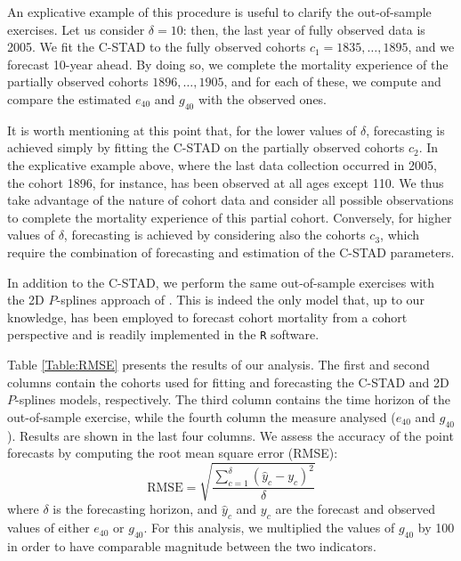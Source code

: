 \documentclass[11pt, a4paper]{article}
\begin{document}

An explicative example of this procedure is useful to clarify the out-of-sample exercises. Let us consider $\delta=10$: then, the last year of fully observed data is 2005. We fit the C-STAD to the fully observed cohorts $c_1=1835,\ldots,1895$, and we forecast 10-year ahead. By doing so, we complete the mortality experience of the partially observed cohorts $1896,\ldots,1905$, and for each of these, we compute and compare the estimated $e_{40}$ and $g_{40}$ with the observed ones. 


It is worth mentioning at this point that, for the lower values of $\delta$, forecasting is achieved simply by fitting the C-STAD on the partially observed cohorts $c_2$. In the explicative example above, where the last data collection occurred in 2005, the cohort 1896, for instance, has been observed at all ages except 110. We thus take advantage of the nature of cohort data and consider all possible observations to complete the mortality experience of this partial cohort.  Conversely, for higher values of $\delta$, forecasting is achieved by considering also the cohorts $c_3$, which require the combination of forecasting and estimation of the C-STAD parameters. 

In addition to the C-STAD, we perform the same out-of-sample exercises with the 2D $P$-splines approach of \cite{currie2004smoothing}. This is indeed the only model that, up to our knowledge, has been employed to forecast cohort mortality from a cohort perspective \citep{cmi2007stochastic} and is readily implemented in the \texttt{R} software.

Table \ref{Table:RMSE} presents the results of our analysis. The first and second columns contain the cohorts used for fitting and forecasting the C-STAD and 2D $P$-splines models, respectively. The third column contains the time horizon of the out-of-sample exercise, while the fourth column the measure analysed ($e_{40}$ and $g_{40}$). Results are shown in the last four columns. We assess the accuracy of the point forecasts by computing the root mean square error (RMSE):
\begin{equation}\label{Eq:RMSE}
\mathrm{RMSE}=\sqrt{\frac{ \sum_{c=1}^{\delta} \left(\hat{y}_c-y_c\right)^2}{\delta}}
\end{equation} 
where $\delta$ is the forecasting horizon, and $\hat{y}_c$ and $y_c$ are the forecast and observed values of either $e_{40}$ or $g_{40}$. For this analysis, we multiplied the values of $g_{40}$ by 100 in order to have comparable magnitude between the two indicators. \par 
\end{document}
